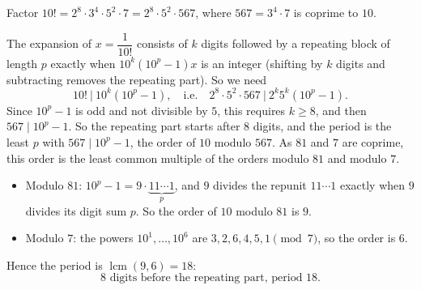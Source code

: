 Factor $10!=2^8\cdot3^4\cdot5^2\cdot7=2^8\cdot5^2\cdot567$, where $567=3^4\cdot7$ is coprime to $10$.

The expansion of $x=\dfrac1{10!}$ consists of $k$ digits followed by a repeating block of length $p$ exactly when $10^k\left(10^p-1\right)x$ is an integer (shifting by $k$ digits and subtracting removes the repeating part). So we need
\[10!\ \Big|\ 10^k\left(10^p-1\right),\quad\text{i.e.}\quad2^8\cdot5^2\cdot567\ \Big|\ 2^k5^k\left(10^p-1\right).\]
Since $10^p-1$ is odd and not divisible by $5$, this requires $k\ge8$, and then $567\mid10^p-1$. So the repeating part starts after $8$ digits, and the period is the least $p$ with $567\mid10^p-1$, the order of $10$ modulo $567$. As $81$ and $7$ are coprime, this order is the least common multiple of the orders modulo $81$ and modulo $7$.
\begin{itemize}
\item Modulo $81$: $10^p-1=9\cdot\underbrace{11\cdots1}_{p}$, and $9$ divides the repunit $11\cdots1$ exactly when $9$ divides its digit sum $p$. So the order of $10$ modulo $81$ is $9$.
\item Modulo $7$: the powers $10^1,\dots,10^6$ are $3,2,6,4,5,1\pmod7$, so the order is $6$.
\end{itemize}
Hence the period is $\operatorname{lcm}(9,6)=18$:
\[\boxed{8\text{ digits before the repeating part, period }18}.\]
